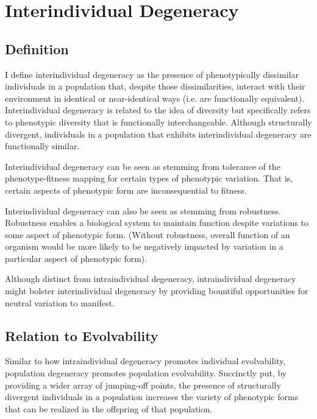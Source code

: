 \section{Interindividual Degeneracy}

\subsection{Definition}

I define interindividual degeneracy as the presence of phenotypically dissimilar individuals in a population that, despite those dissimilarities, interact with their environment in identical or near-identical ways (i.e. are functionally equivalent).
Interindividual degeneracy is related to the idea of diversity but specifically refers to phenotypic diversity that is functionally interchangeable.
Although structurally divergent, individuals in a population that exhibits interindividual degeneracy are functionally similar.

Interindividual degeneracy can be seen as stemming from tolerance of the phenotype-fitness mapping for certain types of phenotypic variation.
That is, certain aspects of phenotypic form are inconsequential to fitness.

Interindividual degeneracy can also be seen as stemming from  robustness.
Robustness enables a biological system to maintain function despite variations to some aspect of phenotypic form.
(Without robustness, overall function of an organism would be more likely to be negatively impacted by variation in a particular aspect of phenotypic form).

Although distinct from intraindividual degeneracy, intraindividual degeneracy might bolster interindividual degeneracy by providing bountiful opportunities for neutral variation to manifest.

\subsection{Relation to Evolvability}
Similar to how intraindividual degeneracy promotes individual evolvability, population degeneracy promotes population evolvability. Succinctly put, by providing a wider array of jumping-off points, the presence of structurally divergent individuals in a population increases the variety of phenotypic forms that can be realized in the offspring of that population.


